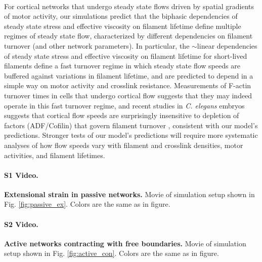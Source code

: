 \paragraph{} For cortical networks that undergo steady state flows driven by spatial gradients of motor activity, our simulations predict that the biphasic dependencies of steady state stress and effective viscosity on filament lifetime define multiple regimes of steady state flow, characterized by different dependencies on filament turnover (and other network parameters).  In particular, the $\sim$linear dependencies of steady state stress and effective viscosity on filament lifetime for short-lived filaments define a fast turnover regime in which steady state flow speeds are buffered against variations in filament lifetime, and are predicted to depend in a simple way on motor activity and crosslink resistance.  Measurements of F-actin turnover times in cells that undergo cortical flow \cite{Theriot1991,Murthy2016,Watanabe1083,Guha2016,Fritzsche15032013,Robin:2014aa} suggests that they may indeed operate in this fast turnover regime, and recent studies in {\em C. elegans} embryos suggests that cortical flow speeds are surprisingly insensitive to depletion of factors (ADF/Cofilin) that govern filament turnover \cite{cellmech_flows}, consistent with our model's predictions. Stronger tests of our model's predictions will require more systematic analyses of how flow speeds vary with filament and crosslink densities, motor activities, and filament lifetimes.



\paragraph{S1 Video.}
\label{passive_ex_video}
{\bf Extensional strain in passive networks.}  Movie of simulation setup shown in Fig. \ref{fig:passive_ex}.  Colors are the same as in figure.

\paragraph{S2 Video.}
\label{active_con_video}
{\bf Active networks contracting with free boundaries.}  Movie of simulation setup shown in Fig. \ref{fig:active_con}.  Colors are the same as in figure.
